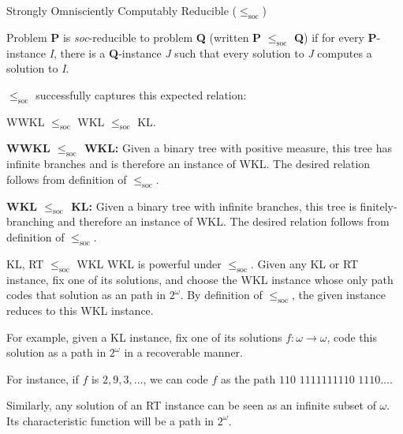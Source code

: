 \begin{frame}{Strongly Omnisciently Computably Reducible
($\leq_{\text{soc}}$)}
  \begin{define*}
    Problem \textbf{P} is \textit{soc}-reducible to problem \textbf{Q}
    (written \textbf{P} $\leq_{\text{soc}}$ \textbf{Q}) if for every
    \textbf{P}-instance \textit{I}, there is a \textbf{Q}-instance
    \textit{J} such that every solution to \textit{J} computes a solution
    to \textit{I}.
  \end{define*}

  $\leq_{\text{soc}}$ successfully captures this expected relation:
  \begin{center}
    WWKL $\leq_{\text{soc}}$ WKL $\leq_{\text{soc}}$ KL.
  \end{center}

  \vspace{0.5em}
  \textbf{WWKL $\leq_{\text{soc}}$ WKL:} Given a binary tree with
  positive measure, this tree has infinite branches and is therefore an
  instance of WKL. The desired relation follows from definition of
  $\leq_{\text{soc}}$.

  \vspace{0.5em}
  \textbf{WKL $\leq_{\text{soc}}$ KL:} Given a binary tree with infinite
  branches, this tree is finitely-branching and therefore an instance of
  WKL. The desired relation follows from definition of $\leq_{\text{soc}}$.
\end{frame}

\begin{frame}{KL, RT $\leq_{\text{soc}}$ WKL}
  WKL is powerful under $\leq_{\text{soc}}$. Given any KL or RT
  instance, fix one of its solutions, and choose the WKL instance whose only
  path codes that solution as an path in $2^\omega$. By definition of
  $\leq_{\text{soc}}$, the given instance reduces to this WKL instance.

  \vspace{1em}
  For example, given a KL instance, fix one of its solutions
  $f:\omega\rightarrow\omega$, code this solution as a path in $2^\omega$
  in a recoverable manner.

  \vspace{1em}
  For instance, if $f$ is $2,9,3,\ldots$, we can code $f$ as the path
  $110$ $1111111110$ $1110\ldots$.

  \vspace{1em}
  Similarly, any solution of an RT instance can be seen as an infinite
  subset of $\omega$. Its characteristic function will be a path in
  $2^\omega$.
\end{frame}

